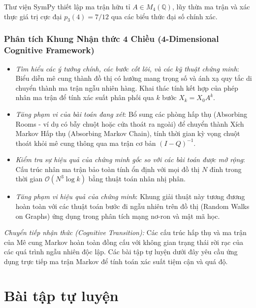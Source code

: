 \documentclass{article}
\begin{document}
Thư viện \textsf{SymPy} thiết lập ma trận hữu tỉ $A \in M_4(\mathbb{Q})$, lũy thừa ma trận và xác thực giá trị cực đại $p_3(4) = 7/12$ qua các biểu thức đại số chính xác.



\subsubsection*{Phân tích Khung Nhận thức 4 Chiều (4-Dimensional Cognitive Framework)}
\begin{itemize}
	\item \textit{Tìm hiểu các ý tưởng chính, các bước cốt lõi, và các kỹ thuật chứng minh}: Biểu diễn mê cung thành đồ thị có hướng mang trọng số và ánh xạ quy tắc di chuyển thành ma trận ngẫu nhiên hàng. Khai thác tính kết hợp của phép nhân ma trận để tính xác suất phân phối qua $k$ bước $X_k = X_0 A^k$.
	\item \textit{Tăng phạm vi của bài toán đang xét}: Bổ sung các phòng hấp thụ (Absorbing Rooms - ví dụ có bẫy chuột hoặc cửa thoát ra ngoài) để chuyển thành Xích Markov Hấp thụ (Absorbing Markov Chain), tính thời gian kỳ vọng chuột thoát khỏi mê cung thông qua ma trận cơ bản $(I - Q)^{-1}$.
	\item \textit{Kiểm tra sự hiệu quả của chứng minh gốc so với các bài toán được mở rộng}: Cấu trúc nhân ma trận bảo toàn tính ổn định với mọi đồ thị $N$ đỉnh trong thời gian $\mathcal{O}(N^3 \log k)$ bằng thuật toán nhân nhị phân.
	\item \textit{Tăng phạm vi hiệu quả của chứng minh}: Khung giải thuật này tương đương hoàn toàn với các thuật toán bước đi ngẫu nhiên trên đồ thị (Random Walks on Graphs) ứng dụng trong phân tích mạng nơ-ron và mật mã học.
\end{itemize}



\emph{Chuyển tiếp nhận thức (Cognitive Transition):} Các cấu trúc hấp thụ và ma trận của Mê cung Markov hoàn toàn đồng cấu với không gian trạng thái rời rạc của các quá trình ngẫu nhiên độc lập. Các bài tập tự luyện dưới đây yêu cầu ứng dụng trực tiếp ma trận Markov để tính toán xác suất tiệm cận và quá độ.

\section{Bài tập tự luyện}
\end{document}
